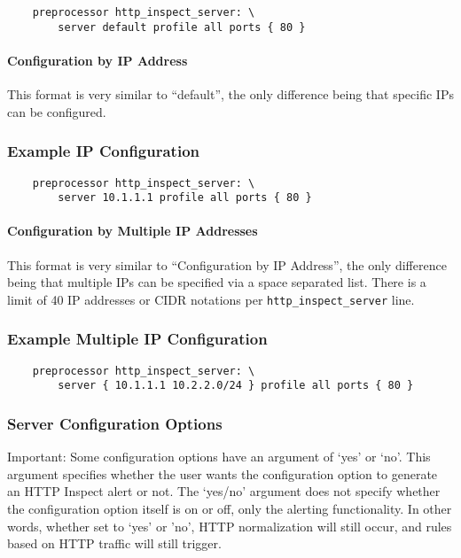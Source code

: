 \documentclass[english]{report}
\begin{document}
\begin{verbatim}
    preprocessor http_inspect_server: \
        server default profile all ports { 80 }
\end{verbatim}

\paragraph{Configuration by IP Address}

This format is very similar to ``default'', the only difference being that
specific IPs can be configured.

\subsubsection{Example IP Configuration}

\begin{verbatim}
    preprocessor http_inspect_server: \
        server 10.1.1.1 profile all ports { 80 }
\end{verbatim}

\paragraph{Configuration by Multiple IP Addresses}

This format is very similar to ``Configuration by IP Address'', the only
difference being that multiple IPs can be specified via a space separated list.
There is a limit of 40 IP addresses or CIDR notations per
\texttt{http\_inspect\_server} line.

\subsubsection{Example Multiple IP Configuration}

\begin{verbatim}
    preprocessor http_inspect_server: \
        server { 10.1.1.1 10.2.2.0/24 } profile all ports { 80 }
\end{verbatim}

\subsubsection{Server Configuration Options}

Important: Some configuration options have an argument of `yes' or `no'.  This
argument specifies whether the user wants the configuration option to generate
an HTTP Inspect alert or not.  The `yes/no' argument does not specify whether
the configuration option itself is on or off, only the alerting functionality.
In other words, whether set to `yes' or 'no', HTTP normalization will still
occur, and rules based on HTTP traffic will still trigger.
\end{document}
